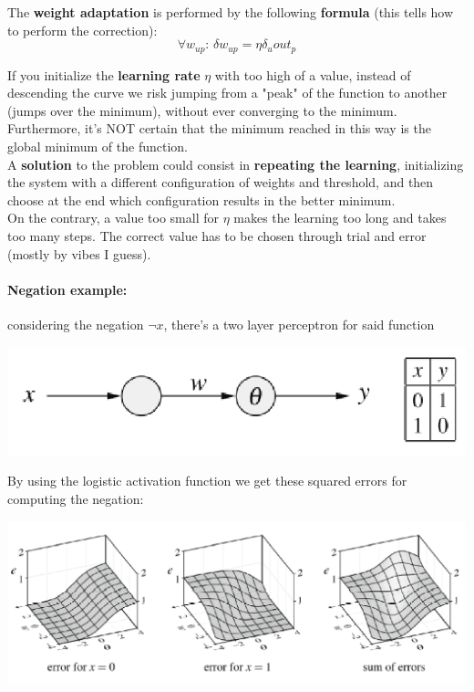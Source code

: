 The \textbf{weight adaptation} is performed by the following \textbf{formula} (this tells how to perform the correction):
$$ \forall w_{up} : \, \delta w_{up} = \eta \delta_u out_p $$

If you initialize the \textbf{learning rate} $\eta$ with too high of a value, instead of descending the curve we risk jumping from a "peak" of the function to another (jumps over the minimum), without ever converging to the minimum. Furthermore, it's NOT certain that the minimum reached in this way is the global minimum of the function. \\

A \textbf{solution} to the problem could consist in \textbf{repeating the learning}, initializing the system with a different configuration of weights and threshold, and then choose at the end which configuration results in the better minimum.\\

On the contrary, a value too small for $\eta$ makes the learning too long and takes too many steps. The correct value has to be chosen through trial and error (mostly by vibes I guess).\\


\paragraph{Negation example:} considering the negation $\neg x$, there's a two layer perceptron for said function
\begin{center}
	\includegraphics[width=0.5\columnwidth]{img/NN/neg1}
\end{center}
By using the logistic activation function we get these squared errors for computing the negation:
\begin{center}
	\includegraphics[width=0.9\columnwidth]{img/NN/neg2}
\end{center}

